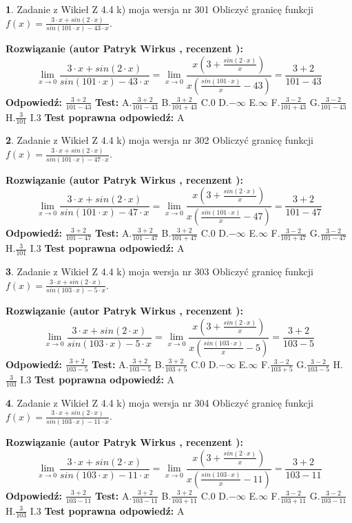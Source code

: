 \documentclass[12pt, a4paper]{article}
\theoremstyle{definition} %
\newtheorem{zad}{}
\newcommand{\zadStart}[1]{\begin{zad}#1\newline}
\newcommand{\zadStop}{\end{zad}}
\newcommand{\rozwStart}[2]{\noindent \textbf{Rozwiązanie (autor #1 , recenzent #2): }\newline}
\newcommand{\rozwStop}{\newline}
\newcommand{\odpStart}{\noindent \textbf{Odpowiedź:}\newline}
\newcommand{\odpStop}{\newline}
\newcommand{\testStart}{\noindent \textbf{Test:}\newline}
\newcommand{\testStop}{\newline}
\newcommand{\kluczStart}{\noindent \textbf{Test poprawna odpowiedź:}\newline}
\newcommand{\kluczStop}{\newline}
\begin{document}
\zadStart{Zadanie z Wikieł Z 4.4 k) moja wersja nr 301}
Obliczyć granicę funkcji $f(x)=\frac{3\cdot x +sin(2\cdot x)}{sin(101\cdot x) -43\cdot x}$.
\zadStop
\rozwStart{Patryk Wirkus}{}
$$\lim\limits_{x\to 0}\frac{3\cdot x +sin(2\cdot x)}{sin(101\cdot x) -43\cdot x}
=\lim\limits_{x\to 0}\frac{x(3+\frac{sin(2\cdot x)}{x})}{x(\frac{sin(101\cdot x)}{x}-43)}
=\frac{3+2}{101-43}$$
\rozwStop
\odpStart
$\frac{3+2}{101-43}$
\odpStop
\testStart
A.$\frac{3+2}{101-43}$
B.$\frac{3+2}{101+43}$
C.$0$
D.$-\infty$
E.$\infty$
F.$\frac{3-2}{101+43}$
G.$\frac{3-2}{101-43}$
H.$\frac{3}{101}$
I.$3$
\testStop
\kluczStart
A
\kluczStop



\zadStart{Zadanie z Wikieł Z 4.4 k) moja wersja nr 302}
Obliczyć granicę funkcji $f(x)=\frac{3\cdot x +sin(2\cdot x)}{sin(101\cdot x) -47\cdot x}$.
\zadStop
\rozwStart{Patryk Wirkus}{}
$$\lim\limits_{x\to 0}\frac{3\cdot x +sin(2\cdot x)}{sin(101\cdot x) -47\cdot x}
=\lim\limits_{x\to 0}\frac{x(3+\frac{sin(2\cdot x)}{x})}{x(\frac{sin(101\cdot x)}{x}-47)}
=\frac{3+2}{101-47}$$
\rozwStop
\odpStart
$\frac{3+2}{101-47}$
\odpStop
\testStart
A.$\frac{3+2}{101-47}$
B.$\frac{3+2}{101+47}$
C.$0$
D.$-\infty$
E.$\infty$
F.$\frac{3-2}{101+47}$
G.$\frac{3-2}{101-47}$
H.$\frac{3}{101}$
I.$3$
\testStop
\kluczStart
A
\kluczStop



\zadStart{Zadanie z Wikieł Z 4.4 k) moja wersja nr 303}
Obliczyć granicę funkcji $f(x)=\frac{3\cdot x +sin(2\cdot x)}{sin(103\cdot x) -5\cdot x}$.
\zadStop
\rozwStart{Patryk Wirkus}{}
$$\lim\limits_{x\to 0}\frac{3\cdot x +sin(2\cdot x)}{sin(103\cdot x) -5\cdot x}
=\lim\limits_{x\to 0}\frac{x(3+\frac{sin(2\cdot x)}{x})}{x(\frac{sin(103\cdot x)}{x}-5)}
=\frac{3+2}{103-5}$$
\rozwStop
\odpStart
$\frac{3+2}{103-5}$
\odpStop
\testStart
A.$\frac{3+2}{103-5}$
B.$\frac{3+2}{103+5}$
C.$0$
D.$-\infty$
E.$\infty$
F.$\frac{3-2}{103+5}$
G.$\frac{3-2}{103-5}$
H.$\frac{3}{103}$
I.$3$
\testStop
\kluczStart
A
\kluczStop



\zadStart{Zadanie z Wikieł Z 4.4 k) moja wersja nr 304}
Obliczyć granicę funkcji $f(x)=\frac{3\cdot x +sin(2\cdot x)}{sin(103\cdot x) -11\cdot x}$.
\zadStop
\rozwStart{Patryk Wirkus}{}
$$\lim\limits_{x\to 0}\frac{3\cdot x +sin(2\cdot x)}{sin(103\cdot x) -11\cdot x}
=\lim\limits_{x\to 0}\frac{x(3+\frac{sin(2\cdot x)}{x})}{x(\frac{sin(103\cdot x)}{x}-11)}
=\frac{3+2}{103-11}$$
\rozwStop
\odpStart
$\frac{3+2}{103-11}$
\odpStop
\testStart
A.$\frac{3+2}{103-11}$
B.$\frac{3+2}{103+11}$
C.$0$
D.$-\infty$
E.$\infty$
F.$\frac{3-2}{103+11}$
G.$\frac{3-2}{103-11}$
H.$\frac{3}{103}$
I.$3$
\testStop
\kluczStart
A
\kluczStop
\end{document}

